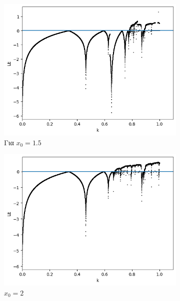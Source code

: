 \begin{figure}[ht]
	\centering
	
	\begin{subfigure}[b]{0.7\textwidth}
		\centering
		\includegraphics[width=\textwidth]{LateX images/graphs q16/g10}
		\caption{Για \(x_0=1.5\)}
		\label{f:g36}
	\end{subfigure}
	\hfill
	\begin{subfigure}[b]{0.7\textwidth}
		\centering
		\includegraphics[width=\textwidth]{LateX images/graphs q16/g11}
		\caption{\(x_0=2\)}
		\label{f:g37}
	\end{subfigure}
	\hfill
	\begin{subfigure}[b]{0.7\textwidth}

\end{subfigure}
\end{figure}
